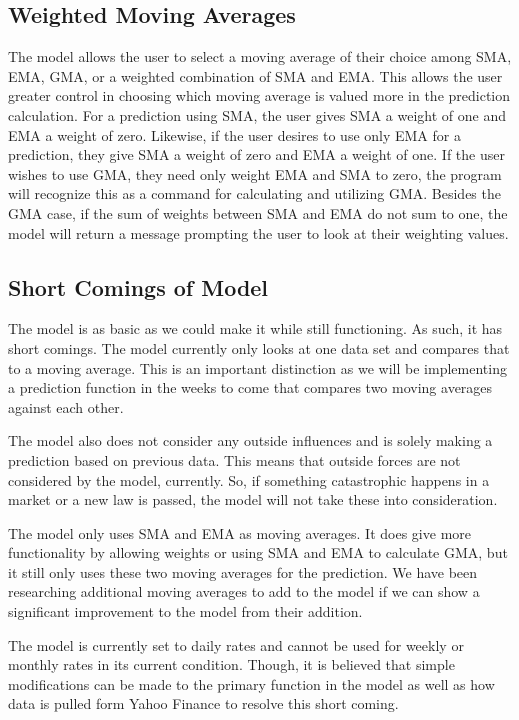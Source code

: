 \documentclass[11pt]{article}
\begin{document}
\subsection*{Weighted Moving Averages}\label{WMA}
The model allows the user to select a moving average of their choice among SMA, EMA, GMA, or a weighted combination of SMA and EMA. This allows the user greater control in choosing which moving average is valued more in the prediction calculation. For a prediction using SMA, the user gives SMA a weight of one and EMA a weight of zero. Likewise, if the user desires to use only EMA for a prediction, they give SMA a weight of zero and EMA a weight of one. If the user wishes to use GMA, they need only weight EMA and SMA to zero, the program will recognize this as a command for calculating and utilizing GMA. Besides the GMA case, if the sum of weights between SMA and EMA do not sum to one, the model will return a message prompting the user to look at their weighting values.

\subsection*{Short Comings of Model}\label{SCM}
The model is as basic as we could make it while still functioning. As such, it has short comings. The model currently only looks at one data set and compares that to a moving average. This is an important distinction as we will be implementing a prediction function in the weeks to come that compares two moving averages against each other.

The model also does not consider any outside influences and is solely making a prediction based on previous data. This means that outside forces are not considered by the model, currently. So, if something catastrophic happens in a market or a new law is passed, the model will not take these into consideration.

The model only uses SMA and EMA as moving averages. It does give more functionality by allowing weights or using SMA and EMA to calculate GMA, but it still only uses these two moving averages for the prediction. We have been researching additional moving averages to add to the model if we can show a significant improvement to the model from their addition.

The model is currently set to daily rates and cannot be used for weekly or monthly rates in its current condition. Though, it is believed that simple modifications can be made to the primary function in the model as well as how data is pulled form Yahoo Finance to resolve this short coming.
\end{document}
